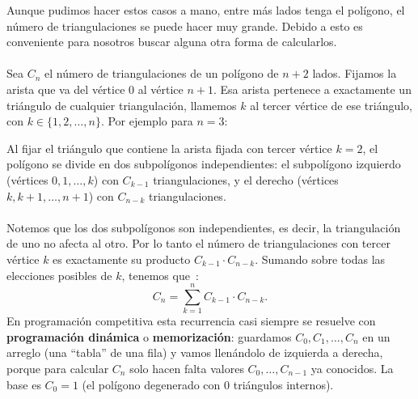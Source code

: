 Aunque pudimos hacer estos casos a mano, entre más lados tenga el polígono, el número de triangulaciones se puede hacer muy grande. Debido a esto es conveniente para nosotros buscar alguna otra forma de calcularlos.
\\\\
Sea $C_n$ el número de triangulaciones de un polígono de $n+2$ lados. Fijamos la arista que va del vértice $0$ al vértice $n+1$. Esa arista pertenece a exactamente un triángulo de cualquier triangulación, llamemos $k$ al tercer vértice de ese triángulo, con $k \in \{1, 2, \ldots, n\}$. Por ejemplo para $n=3$:
 \begin{figure}[H]
\centering
{}
\end{figure}
Al fijar el triángulo que contiene la arista fijada con tercer vértice $k=2$, el polígono se divide en dos subpolígonos independientes: el subpolígono izquierdo (vértices $0,1,\ldots,k$) con $C_{k-1}$ triangulaciones, y el derecho (vértices $k, k+1,\ldots, n+1$) con $C_{n-k}$ triangulaciones.
\\\\
Notemos que los dos subpolígonos son independientes, es decir, la triangulación de uno no afecta al otro. Por lo tanto el número de triangulaciones con tercer vértice $k$ es exactamente su producto $C_{k-1} \cdot C_{n-k}$. Sumando sobre todas las elecciones posibles de $k$, tenemos que~\cite{cf_catalan}:
\[
C_n = \sum_{k=1}^{n} C_{k-1} \cdot C_{n-k}.
\]
En programación competitiva esta recurrencia casi siempre se resuelve con \textbf{programación dinámica} o \textbf{memorización}: guardamos $C_0,C_1,\ldots,C_n$ en un arreglo (una ``tabla'' de una fila) y vamos llenándolo de izquierda a derecha, porque para calcular $C_n$ solo hacen falta valores $C_0,\ldots,C_{n-1}$ ya conocidos. La base es $C_0=1$ (el polígono degenerado con $0$ triángulos internos).

